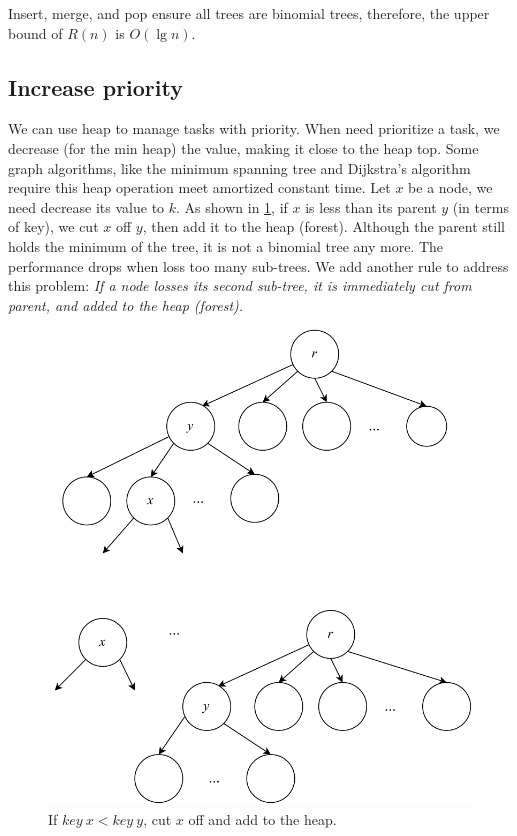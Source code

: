 \documentclass[b5paper]{article}
\begin{document}
Insert, merge, and pop ensure all trees are binomial trees, therefore, the upper bound of $R(n)$ is $O(\lg n)$.

\subsection{Increase priority}

We can use heap to manage tasks with priority. When need prioritize a task, we decrease (for the min heap) the value, making it close to the heap top. Some graph algorithms, like the minimum spanning tree and Dijkstra's algorithm require this heap operation\cite{CLRS} meet amortized constant time. Let $x$ be a node, we need decrease its value to $k$. As shown in \cref{fig:cut-fib-tree}, if $x$ is less than its parent $y$ (in terms of key), we cut $x$ off $y$, then add it to the heap (forest). Although the parent still holds the minimum of the tree, it is not a binomial tree any more. The performance drops when loss too many sub-trees. We add another rule to address this problem: {\em If a node losses its second sub-tree, it is immediately cut from parent, and added to the heap (forest).}

\begin{figure}[htbp]
  \centering
  \includegraphics[scale=0.5]{img/fib-cut-past}
  \caption{If $key\ x < key\ y$, cut $x$ off and add to the heap.}
  \label{fig:cut-fib-tree}
\end{figure}
\end{document}
